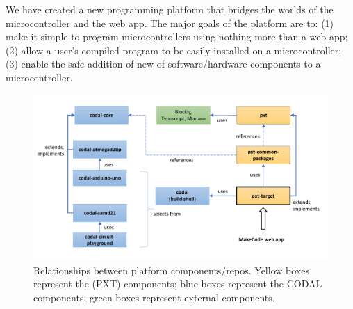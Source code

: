 We have created a new programming platform that bridges the worlds of the microcontroller
and the web app. The major goals of the platform are to: (1)
make it simple to program microcontrollers using nothing more than a web app;
(2) allow a user's compiled program to be easily installed on a microcontroller;
(3) enable the safe addition of new of software/hardware components to a microcontroller.

\begin{figure}[t]
  \includegraphics[width=5.5in]{reposFig.pdf}
  \caption{\label{fig:repos}Relationships between platform components/repos. Yellow boxes represent the \MC (PXT) components; blue
  boxes represent the CODAL components; green boxes represent external components.}
\end{figure}

